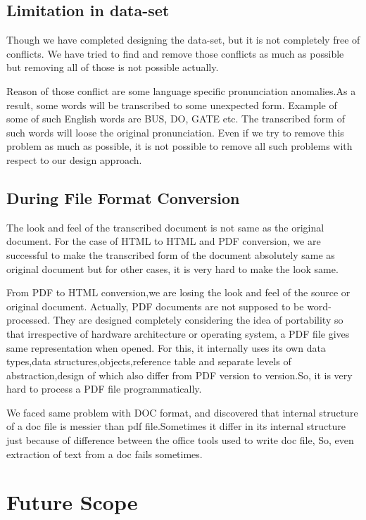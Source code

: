 \documentclass[12pt,oneside,openany,a4paper]{book}
\begin{document}
\subsection{Limitation in data-set}
Though we have completed designing the data-set, but it is not completely free of conflicts. We have tried to find and remove those conflicts as much as possible but removing all of those is not possible actually.

Reason of those conflict are some language specific pronunciation anomalies.As a result, some words will be transcribed to some unexpected form. Example of some of such English words are BUS, DO, GATE etc. The transcribed form of such words will loose the original pronunciation. Even if we try to remove this problem as much as possible, it is not possible to remove all such problems with respect to our design approach.

\subsection{During File Format Conversion}
The look and feel of the transcribed document is not same as the original document. For the case of HTML to HTML and PDF conversion, we are successful to make the transcribed form of the document absolutely same as original document but for other cases, it is very hard to make the look same.

From PDF to HTML conversion,we are losing the look and feel of the source or original document. Actually, PDF documents are not supposed to be word-processed. They are designed completely considering the idea of portability so that irrespective of hardware architecture or operating system, a PDF file gives same representation when opened. For this, it internally uses its own data types,data structures,objects,reference table and separate levels of abstraction,design of which also differ from PDF version to version.So, it is very hard to process a PDF file programmatically. 

We faced same problem with DOC format, and discovered that internal structure of a doc file is messier than pdf file.Sometimes it differ in its internal structure just because of difference between the office tools used to write doc file, So, even extraction of text from a doc fails sometimes.

\vspace{1cm}


\section{Future Scope}
\end{document}
